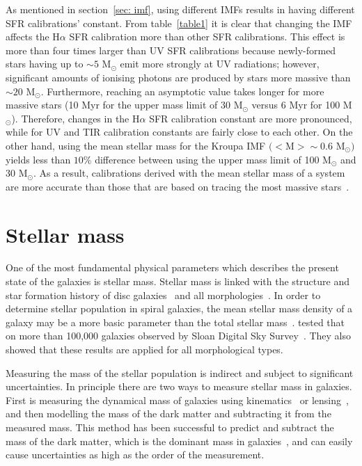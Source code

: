 As mentioned in section~\ref{sec: imf}, using different IMFs results in having different SFR calibrations' constant. 
From table~\ref{table1} it is clear that changing the IMF affects the H${\alpha}$ SFR calibration more than other SFR calibrations. 
This effect is more than four times larger than UV SFR calibrations because newly-formed stars having up to $\sim 5$ M$_{\odot}$ emit more strongly at UV radiations; however, significant amounts of ionising photons are produced by stars more massive than $\sim 20$ M$_{\odot}$. 
Furthermore, reaching an asymptotic value takes longer for more massive stars (10 Myr for the upper mass limit of 30 M$_{\odot}$ versus 6 Myr for 100 M$_{\odot}$). 
Therefore, changes in the H${\alpha}$ SFR calibration constant are more pronounced, while for UV and TIR calibration constants are fairly close to each other.
On the other hand, using the mean stellar mass for the Kroupa IMF $(<$M$> \sim 0.6$ M$_{\odot})$ yields less than $10\%$ difference between using the upper mass limit of 100 M$_{\odot}$ and 30 M$_{\odot}$. 
As a result, calibrations derived with the mean stellar mass of a system are more accurate than those that are based on tracing the most massive stars~\citep{Calzetti13}.

\section{Stellar mass}
\label{sec: starmass_intro}
One of the most fundamental physical parameters which describes the present state of the galaxies is stellar mass. 
Stellar mass is linked with the structure and star formation history of disc galaxies~\citep{Gavvazi96} and all morphologies~\citep{Scodeggio02}. 
In order to determine stellar population in spiral galaxies, the mean stellar mass density of a galaxy may be a more basic parameter than the total stellar mass~\citep{Bell00}. 
\cite{Kauffmann03} tested that on more than 100,000 galaxies observed by Sloan Digital Sky Survey~\citep[SDSS;][]{York00}. 
They also showed that these results are applied for all morphological types.

Measuring the mass of the stellar population is indirect and subject to significant uncertainties. 
In principle there are two ways to measure stellar mass in galaxies. 
First is measuring the dynamical mass of galaxies using kinematics~\citep{Cappellari06} or lensing~\citep{Auger09}, and then modelling the mass of the dark matter and subtracting it from the measured mass. 
This method has been successful to predict and subtract the mass of the dark matter, which is the dominant mass in galaxies~\citep{Zaritsky94}, and can easily cause uncertainties as high as the order of the measurement. 

